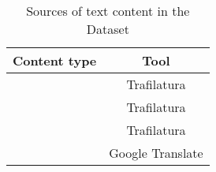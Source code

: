 \begin{table}%
    \centering
    \begin{tabular}{c|c}
       Content type  & Tool \\ \hline
       \trafilaturaTitle{}  & Trafilatura \\
       \trafilaturaAbstract{}  & Trafilatura \\
       \trafilaturaFulltext{}  & Trafilatura \\
       \translationTitle{}  & Google Translate \\
    \end{tabular}
    \caption{Sources of text content in the \VSI{} Dataset}
    \label{tab:04_pesv_sources of content}
\end{table}

